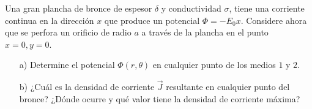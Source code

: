 \documentclass[
  11pt,
  letterpaper,
   addpoints,
  ]{exam}
\begin{document}
\begin{questions}
    \question     
  
Una gran plancha de bronce de espesor \( \delta \) y conductividad \( \sigma \), tiene una corriente continua en la dirección \( x \) que produce un potencial \( \Phi = -E_0 x \). 
Considere ahora que se perfora un orificio de radio \( a \) a través de la plancha en el punto \( x = 0, y = 0 \).

\begin{itemize}
    \item[a)] Determine el potencial \( \Phi (r,\theta) \) en cualquier punto de los medios \( 1 \) y \( 2 \).
    \item[b)] ¿Cuál es la densidad de corriente \( \vec{J} \) resultante en cualquier punto del bronce? ¿Dónde ocurre y qué valor tiene la densidad de corriente máxima?
\end{itemize}


\end{questions}
\end{document}
